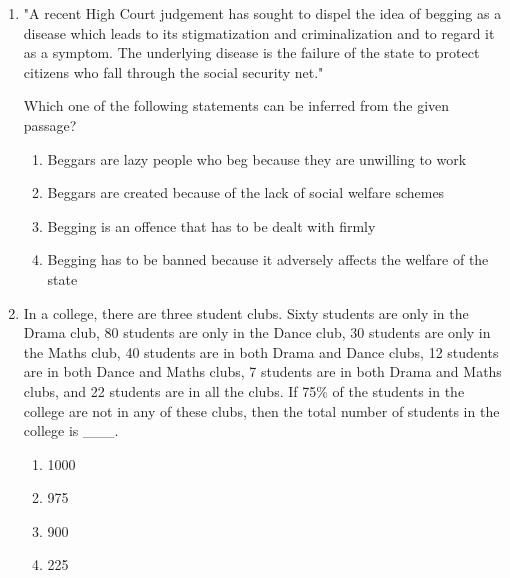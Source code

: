 \documentclass[12pt]{article}
\begin{document}
\begin{enumerate}[label=\textbf{Q.\arabic*}., start=6, leftmargin=*]
		\begin{multicols}{2}
			\begin{enumerate}[label=(\Alph*)]
				\item 0 to 15
				\item 16 to 30
				\item 31 to 45
				\item 46 to 60
			\end{enumerate}
		\end{multicols}

	\item "A recent High Court judgement has sought to dispel the idea of begging as a disease which leads to its stigmatization and criminalization and to regard it as a symptom. The underlying disease is the failure of the state to protect citizens who fall through the social security net."

		Which one of the following statements can be inferred from the given passage?
		\begin{enumerate}[label=(\Alph*)]
			\item Beggars are lazy people who beg because they are unwilling to work
			\item Beggars are created because of the lack of social welfare schemes
			\item Begging is an offence that has to be dealt with firmly
			\item Begging has to be banned because it adversely affects the welfare of the state
		\end{enumerate}
	\item In a college, there are three student clubs. Sixty students are only in the Drama club, 80 students are only in the Dance club, 30 students are only in the Maths club, 40 students are in both Drama and Dance clubs, 12 students are in both Dance and Maths clubs, 7 students are in both Drama and Maths clubs, and 22 students are in all the clubs. If 75\% of the students in the college are not in any of these clubs, then the total number of students in the college is \_\_\_.
		\begin{multicols}{2}
			\begin{enumerate}[label=(\Alph*)]
				\item 1000
				\item 975
				\item 900
				\item 225
			\end{enumerate}
		\end{multicols}


\end{enumerate}
\end{document}
